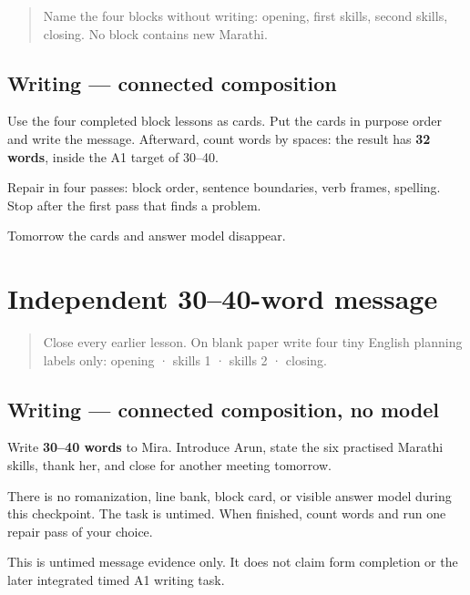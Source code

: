 \begin{quote}
Name the four blocks without writing: opening, first skills, second skills, closing. No block contains new Marathi.
\end{quote}

\subsection*{Writing — connected composition}
Use the four completed block lessons as cards. Put the cards in purpose order and write the message. Afterward, count words by spaces: the result has \textbf{32 words}, inside the A1 target of 30–40.

Repair in four passes: block order, sentence boundaries, verb frames, spelling. Stop after the first pass that finds a problem.

\begin{tcolorbox}[breakable,colback=teal!4,colframe=teal!35!black,title={Before you move on}]
Tomorrow the cards and answer model disappear.
\end{tcolorbox}
\section[independent named-reader message]{Independent 30–40-word message}

\label{lesson:MR-A1M18-independent-message}



\begin{quote}
Close every earlier lesson. On blank paper write four tiny English planning labels only: opening · skills 1 · skills 2 · closing.
\end{quote}

\subsection*{Writing — connected composition, no model}
Write \textbf{30–40 words} to Mira. Introduce Arun, state the six practised Marathi skills, thank her, and close for another meeting tomorrow.

There is no romanization, line bank, block card, or visible answer model during this checkpoint. The task is untimed. When finished, count words and run one repair pass of your choice.

\begin{tcolorbox}[breakable,colback=teal!4,colframe=teal!35!black,title={Before you move on}]
This is untimed message evidence only. It does not claim form completion or the later integrated timed A1 writing task.
\end{tcolorbox}
